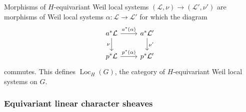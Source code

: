 \documentclass[10pt]{amsart}
\theoremstyle{plain}
\theoremstyle{definition}
\DeclareMathOperator{\Loc}{Loc}
\newcommand{\iso}{{\ \cong\ }}
\newcommand{\cs}[1]{{\mathcal{#1}}}
\begin{document}
Morphisms of $H$-equivariant Weil local systems $(\cs{L},\nu)\to (\cs{L}',\nu')$ are morphisms of Weil local systems $\alpha: \cs{L}\to \cs{L}'$ for which the diagram
\begin{equation}\label{E3}
\begin{tikzcd}
\arrow{d}[swap]{\nu} a^*\cs{L} \arrow{r}{a^*(\alpha)} & a^*\cs{L}' \arrow{d}{\nu'} \\
p^*\cs{L} \arrow{r}{p^*(\alpha)} & p^*\cs{L}'
\end{tikzcd}
\end{equation}
commutes.
This defines $\Loc_H(G)$, the category of $H$-equivariant Weil local systems on $G$.

\subsubsection{Equivariant linear character sheaves}\label{ssec:equivariant2}
\end{document}
